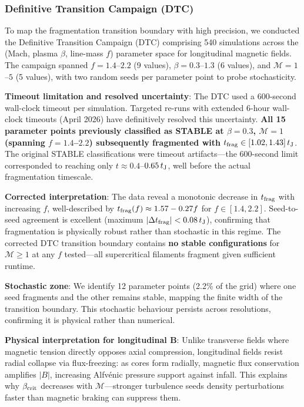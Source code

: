 \documentclass[twocolumn,usenatbib]{mnras}
\begin{document}
\subsubsection{Definitive Transition Campaign (DTC)}
\label{sec:dtc}

To map the fragmentation transition boundary with high precision, we conducted the Definitive Transition Campaign (DTC) comprising 540 simulations across the (Mach, plasma $\beta$, line-mass $f$) parameter space for longitudinal magnetic fields. The campaign spanned $f = 1.4$--$2.2$ (9 values), $\beta = 0.3$--$1.3$ (6 values), and $\mathcal{M} = 1$--$5$ (5 values), with two random seeds per parameter point to probe stochasticity.

\textbf{Timeout limitation and resolved uncertainty}: The DTC used a 600-second wall-clock timeout per simulation. Targeted re-runs with extended 6-hour wall-clock timeouts (April 2026) have definitively resolved this uncertainty. \textbf{All 15 parameter points previously classified as STABLE at $\beta = 0.3$, $\mathcal{M} = 1$ (spanning $f = 1.4$--$2.2$) subsequently fragmented with $t_{\rm frag} \in [1.02, 1.43]\,t_{\rm J}$}. The original STABLE classifications were timeout artifacts—the 600-second limit corresponded to reaching only $t \approx 0.4$--$0.65\,t_{\rm J}$, well before the actual fragmentation timescale.

\textbf{Corrected interpretation}: The data reveal a monotonic decrease in $t_{\rm frag}$ with increasing $f$, well-described by $t_{\rm frag}(f) \approx 1.57 - 0.27f$ for $f \in [1.4, 2.2]$. Seed-to-seed agreement is excellent (maximum $|\Delta t_{\rm frag}| < 0.08\,t_{\rm J}$), confirming that fragmentation is physically robust rather than stochastic in this regime. The corrected DTC transition boundary contains \textbf{no stable configurations} for $\mathcal{M} \geq 1$ at any $f$ tested—all supercritical filaments fragment given sufficient runtime.

\textbf{Stochastic zone}: We identify 12 parameter points (2.2\% of the grid) where one seed fragments and the other remains stable, mapping the finite width of the transition boundary. This stochastic behaviour persists across resolutions, confirming it is physical rather than numerical.

\textbf{Physical interpretation for longitudinal B}: Unlike transverse fields where magnetic tension directly opposes axial compression, longitudinal fields resist radial collapse via flux-freezing: as cores form radially, magnetic flux conservation amplifies $|B|$, increasing Alfv\'enic pressure support against infall. This explains why $\beta_{\rm crit}$ decreases with $\mathcal{M}$---stronger turbulence seeds density perturbations faster than magnetic braking can suppress them.
\end{document}
